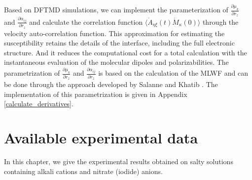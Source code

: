Based on DFTMD simulations, we can implement the parameterization of $\frac{\partial \mu_{k}}{\partial r_z}$ and $\frac{\partial\alpha_{ij}}{\partial r_z}$
and calculate the correlation function $\langle\dot{A}_{\eta\xi}(t)\dot{M}_{\kappa}(0)\rangle$ through the velocity auto-correlation function. 
This approximation for estimating the susceptibility retains the details of the interface, including the full electronic structure. 
And it reduces the computational cost for a total calculation with the instantaneous evaluation of the molecular dipoles and polarizabilities\cite{sulpizi2013}. 
The parametrization of $\frac{\partial \mu_{k}}{\partial r_z}$ and $\frac{\partial\alpha_{ij}}{\partial r_z}$ is based 
on the calculation of the MLWF\cite{Marzari97} 
 and can be done through the approach developed by Salanne \etal \cite{Salanne08} and Khatib \etal \cite{Khatib2017}.
The implementation of this parametrization is given in Appendix \ref{calculate_derivatives}.
\section{Available experimental data}\label{section_SFG_Exp}
In this chapter, we give the experimental results obtained on salty solutions containing alkali cations and nitrate (iodide) anions\cite{PS03,AJ12,HuaWei2014}. 

